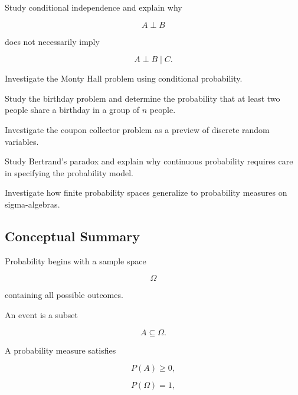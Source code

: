 \begin{exercise}[4]
Study conditional independence and explain why

\[
A\perp B
\]

does not necessarily imply

\[
A\perp B\mid C.
\]
\end{exercise}

\begin{exercise}[4]
Investigate the Monty Hall problem using conditional probability.
\end{exercise}

\begin{exercise}[4]
Study the birthday problem and determine the probability that at least
two people share a birthday in a group of \(n\) people.
\end{exercise}

\begin{exercise}[4]
Investigate the coupon collector problem as a preview of discrete random
variables.
\end{exercise}

\begin{exercise}[4]
Study Bertrand's paradox and explain why continuous probability requires
care in specifying the probability model.
\end{exercise}

\begin{exercise}[4]
Investigate how finite probability spaces generalize to probability
measures on sigma-algebras.
\end{exercise}

\subsection{Conceptual Summary}
\label{subsec:elementary-probability-summary}

Probability begins with a sample space

\[
\boxed{
\Omega
}
\]

containing all possible outcomes.

An event is a subset

\[
\boxed{
A\subseteq\Omega.
}
\]

A probability measure satisfies

\[
\boxed{
P(A)\geq0,
}
\]

\[
\boxed{
P(\Omega)=1,
}
\]

